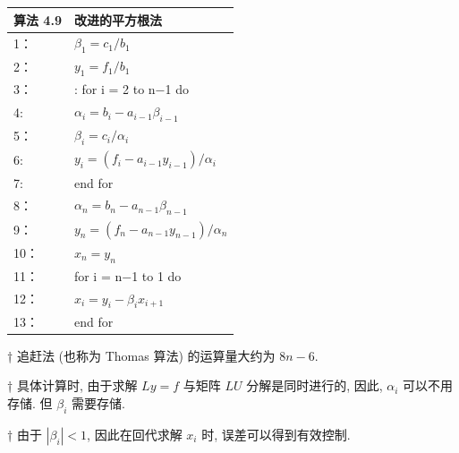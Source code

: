 \documentclass[12pt,a4paper]{article}
\begin{document}
\begin{table}  
	\begin{tabular*}{16cm}{ll}  
		\hline  
		算法 4.9 &改进的平方根法\\  
		\hline  
		1：   & $\beta_{1}=c_{1} / b_{1}$\\  
		2：   & $y_{1}=f_{1} / b_{1}$\\
		3：   & : for i = 2 to n−1 do \\
		4:    & \qquad $\alpha_{i}=b_{i}-a_{i-1} \beta_{i-1}$\\
		5：   & \qquad $\beta_{i}=c_{i} / \alpha_{i}$\\
		6:    & \qquad $y_{i}=\left(f_{i}-a_{i-1} y_{i-1}\right) / \alpha_{i}$\\
		7:   & end for\\
		8：   & $\alpha_{n}=b_{n}-a_{n-1} \beta_{n-1}$ \\
		9：   & $y_{n}=\left(f_{n}-a_{n-1} y_{n-1}\right) / \alpha_{n}$\\
		10：  & $x_{n}=y_{n}$\\
		11：  & for i = n−1 to 1 do\\
		12：  & \qquad $x_{i}=y_{i}-\beta_{i} x_{i+1}$\\
		13：  & end for\\
		\hline  
	\end{tabular*}  
\end{table}

\begin{framed}
	† 追赶法 (也称为 Thomas 算法) 的运算量大约为 $8n − 6$.
\end{framed}

\begin{framed}
	† 具体计算时, 由于求解 $Ly = f$ 与矩阵 $LU$ 分解是同时进行的, 因此,
	$\alpha_i$ 可以不用存储. 但 $\beta_i$ 需要存储.
\end{framed}

\begin{framed}
	† 由于 $|\beta_i| < 1$, 因此在回代求解 $x_i$ 时, 误差可以得到有效控制.
\end{framed}
\end{document}
